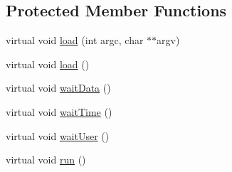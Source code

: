 \subsection*{Protected Member Functions}
\begin{DoxyCompactItemize}
\item 
virtual void \hyperlink{class_k_1_1_klass_af62dc66ce38ed384a91677aa1485eb1f}{load} (int argc, char $\ast$$\ast$argv)
\item 
virtual void \hyperlink{class_k_1_1_klass_a5588964fff1d1025245d134e159b60ee}{load} ()
\item 
virtual void \hyperlink{class_k_1_1_klass_a62a6bf36d7c8bec9dcf7af20c9d21d74}{wait\+Data} ()
\item 
virtual void \hyperlink{class_k_1_1_klass_a60afdc2eaa268d8c41a2d6897fbf4fff}{wait\+Time} ()
\item 
virtual void \hyperlink{class_k_1_1_klass_af4f5201bed25a292d8a7f40470d83923}{wait\+User} ()
\item 
virtual void \hyperlink{class_k_1_1_klass_a72fcb26a14f6beb1c3fbace9ab3e7dbb}{run} ()
\end{DoxyCompactItemize}
